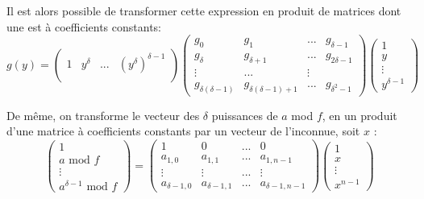 \documentclass[a4paper]{article}
\begin{document}
Il est alors possible de transformer cette expression en produit de matrices dont une est à coefficients constants:
\[
g(y) = 
\begin{pmatrix}
    1 & y^\delta & ... & (y^\delta)^{\delta-1}  \\  
\end{pmatrix}
\begin{pmatrix}
    g_0 & g_1 & ... & g_{\delta-1} \\
    g_{\delta} & g_{\delta+1} & ... & g_{2\delta-1} \\
    \vdots & ... & \vdots \\
    g_{\delta(\delta-1)} & g_{\delta(\delta-1)+1} & ... & g_{\delta^2-1}
\end{pmatrix}
\begin{pmatrix}
    1 \\
    y \\
    \vdots \\
    y^{\delta-1}
\end{pmatrix}
\]

De même, on transforme le vecteur des $\delta$ puissances de $a$ mod $f$, en un produit d'une matrice à coefficients constants par un vecteur de l'inconnue, soit $x$ :
\[
    \begin{pmatrix}
        1 \\
        a \text{ mod }f\\
        \vdots \\
        a^{\delta-1} \text{ mod }f
    \end{pmatrix}
    =
    \begin{pmatrix}
        1 & 0 & ... & 0 \\
        a_{1,0} & a_{1,1} & ... & a_{1,n-1} \\
        \vdots & \vdots & ... & \vdots \\
        a_{\delta-1,0} & a_{\delta-1,1} & ... & a_{\delta-1,n-1}
    \end{pmatrix}
    \begin{pmatrix}
        1 \\
        x \\
        \vdots \\
        x^{n-1}
    \end{pmatrix}
\]
\end{document}
